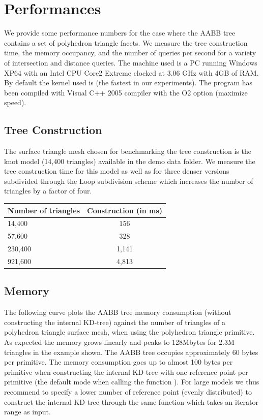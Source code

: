 \section{Performances}
\label{AABB_tree_section_performances}

We provide some performance numbers for the case where the AABB tree contains a set of polyhedron triangle facets. We measure the tree construction time, the memory occupancy, and the number of queries per second for a variety of intersection and distance queries. The machine used is a PC running Windows XP64 with an Intel CPU Core2 Extreme clocked at 3.06 GHz with 4GB of RAM. By default the kernel used is  (the fastest in our experiments). The program has been compiled with Visual C++ 2005 compiler with the O2 option (maximize speed).

\subsection{Tree Construction}

The surface triangle mesh chosen for benchmarking the tree construction is the knot model (14,400 triangles) available in the demo data folder. We measure the tree construction time for this model as well as for three denser versions subdivided through the Loop subdivision scheme which increases the number of triangles by a factor of four.


\begin{tabular}{|l|c|}
  \hline
  Number of triangles & Construction (in ms)\\
  \hline
   14,400 &   156 \\
   57,600 &   328 \\
  230,400 & 1,141 \\
  921,600 & 4,813 \\
  \hline
\end{tabular}

\subsection{Memory}

The following curve plots the AABB tree memory consumption (without constructing the internal KD-tree) against the number of triangles of a polyhedron triangle surface mesh, when using the polyhedron triangle primitive. As expected the memory grows linearly and peaks to 128Mbytes for 2.3M triangles in the example shown. The AABB tree occupies approximately 60 bytes per primitive. The memory consumption goes up to almost 100 bytes per primitive when constructing the internal KD-tree with one reference point per primitive (the default mode when calling the function ). For large models we thus recommend to specify a lower number of reference point (evenly distributed) to construct the internal KD-tree through the same function which takes an iterator range as input.

